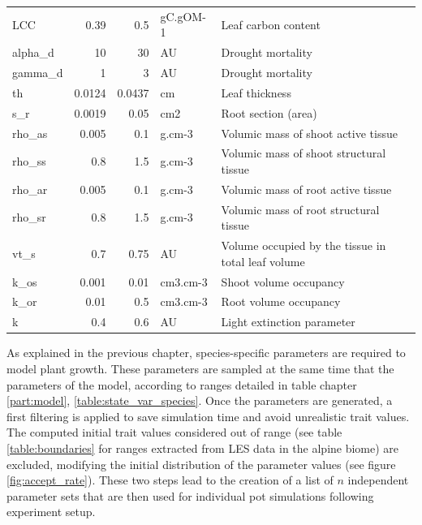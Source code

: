 \begin{table2*}
\begin{tabular}{lrrll}
LCC         & 0.39    & 0.5    & gC.gOM-1                     & Leaf carbon content                                \\
alpha\_d    & 10      & 30     & AU                           & Drought mortality                                  \\
gamma\_d    & 1       & 3      & AU                           & Drought mortality                                  \\
th          & 0.0124  & 0.0437 & cm                           & Leaf thickness                                     \\
s\_r        & 0.0019  & 0.05   & cm2                          & Root section (area)                                \\
rho\_as     & 0.005   & 0.1    & g.cm-3                       & Volumic mass of shoot active tissue                \\
rho\_ss     & 0.8     & 1.5    & g.cm-3                       & Volumic mass of shoot structural tissue            \\
rho\_ar     & 0.005   & 0.1    & g.cm-3                       & Volumic mass of root active tissue                 \\
rho\_sr     & 0.8     & 1.5    & g.cm-3                       & Volumic mass of root structural tissue             \\
vt\_s       & 0.7     & 0.75   & AU                           & Volume occupied by the tissue in total leaf volume \\
k\_os       & 0.001   & 0.01   & cm3.cm-3                     & Shoot volume occupancy                             \\
k\_or       & 0.01    & 0.5    & cm3.cm-3                     & Root volume occupancy                              \\
k           & 0.4     & 0.6    & AU                           & Light extinction parameter                        
\end{tabular}
\vspace*{0.5cm}
\end{table2*}

As explained in the previous chapter, species-specific parameters are required to model plant growth. These parameters are sampled at the same time that the parameters of the model, according to ranges detailed in table chapter \ref{part:model}, \ref{table:state_var_species}. Once the parameters are generated, a first filtering is applied to save simulation time and avoid unrealistic trait values. The computed initial trait values considered out of range (see table \ref{table:boundaries} for ranges extracted from LES data \parencite{wright_worldwide_2004} in the alpine biome) are excluded, modifying the initial distribution of the parameter values (see figure \ref{fig:accept_rate}). These two steps lead to the creation of a list of $n$ independent parameter sets that are then used for individual pot simulations following \cite{peterson_growth_1982} experiment setup.
\\

